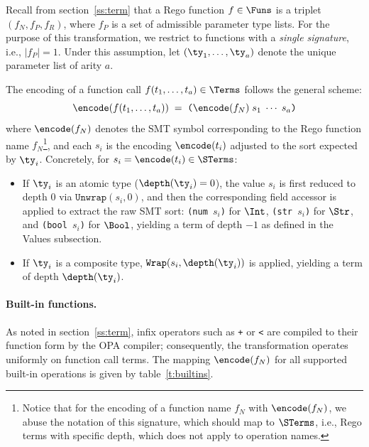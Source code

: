 Recall from section~\ref{ss:term} that a Rego function $f \in \Funs$ is a triplet $(f_N, f_P, f_R)$, where $f_P$ is a set of admissible parameter type lists.
For the purpose of this transformation, we restrict to functions with a \emph{single signature}, i.e., $|f_P| = 1$.
Under this assumption, let $(\ty_1, \dots, \ty_a)$ denote the unique parameter list of arity $a$.

The encoding of a function call $f(t_1, \dots, t_a) \in \Terms$ follows the general scheme:
$$\encode(f(t_1, \dots, t_a)) \;=\; \texttt{(}\encode(f_N)\; s_1\; \cdots\; s_a\texttt{)}$$
where $\encode(f_N)$ denotes the SMT symbol corresponding to the Rego function name $f_N$\footnote{
  Notice that for the encoding of a function name $f_N$ with $\encode(f_N)$, we abuse the notation of this signature, which should map to $\STerms$, i.e., Rego terms with specific depth, which does not apply to operation names.
}, and each $s_i$ is the encoding $\encode(t_i)$ adjusted to the sort expected by $\ty_i$.
Concretely, for $s_i = \encode(t_i) \in \STerms$:
\begin{itemize}
  \item If $\ty_i$ is an atomic type ($\depth(\ty_i) = 0$), the value $s_i$ is first reduced to depth $0$ via $\texttt{Unwrap}(s_i, 0)$, and then the corresponding field accessor is applied to extract the raw SMT sort: \texttt{(num $s_i$)} for $\Int$, \texttt{(str $s_i$)} for $\Str$, and \texttt{(bool $s_i$)} for $\Bool$, yielding a term of depth $-1$ as defined in the Values subsection.
  \item If $\ty_i$ is a composite type, $\texttt{Wrap}(s_i, \depth(\ty_i))$ is applied, yielding a term of depth $\depth(\ty_i)$.
\end{itemize}

\paragraph{Built-in functions.}
As noted in section~\ref{ss:term}, infix operators such as \texttt{+} or \texttt{<} are compiled to their function form by the OPA compiler; consequently, the transformation operates uniformly on function call terms.
The mapping $\encode(f_N)$ for all supported built-in operations is given by table~\ref{t:builtins}.

